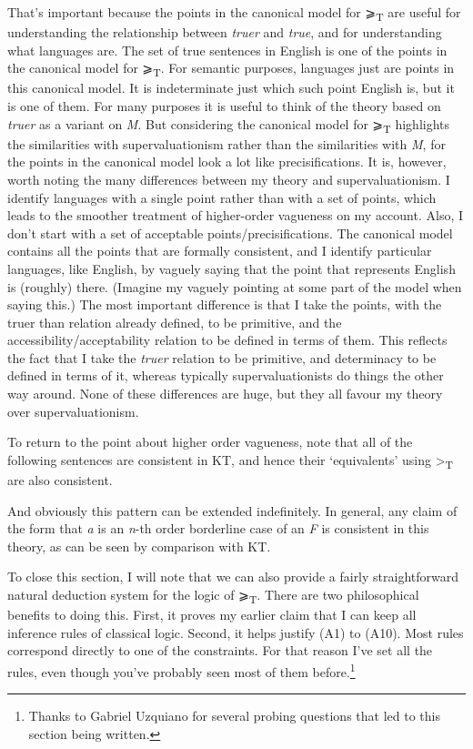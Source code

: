 \documentclass[
  10pt,
  letterpaper,
  DIV=11,
  numbers=noendperiod,
  twoside]{scrartcl}
\begin{document}
That's important because the points in the canonical model for
⩾\textsubscript{T} are useful for understanding the relationship between
\emph{truer} and \emph{true}, and for understanding what languages are.
The set of true sentences in English is one of the points in the
canonical model for ⩾\textsubscript{T}. For semantic purposes, languages
just are points in this canonical model. It is indeterminate just which
such point English is, but it is one of them. For many purposes it is
useful to think of the theory based on \emph{truer} as a variant on
\emph{M}. But considering the canonical model for ⩾\textsubscript{T}
highlights the similarities with supervaluationism rather than the
similarities with \emph{M}, for the points in the canonical model look a
lot like precisifications. It is, however, worth noting the many
differences between my theory and supervaluationism. I identify
languages with a single point rather than with a set of points, which
leads to the smoother treatment of higher-order vagueness on my account.
Also, I don't start with a set of acceptable points/precisifications.
The canonical model contains all the points that are formally
consistent, and I identify particular languages, like English, by
vaguely saying that the point that represents English is (roughly)
there. (Imagine my vaguely pointing at some part of the model when
saying this.) The most important difference is that I take the points,
with the truer than relation already defined, to be primitive, and the
accessibility/acceptability relation to be defined in terms of them.
This reflects the fact that I take the \emph{truer} relation to be
primitive, and determinacy to be defined in terms of it, whereas
typically supervaluationists do things the other way around. None of
these differences are huge, but they all favour my theory over
supervaluationism.

To return to the point about higher order vagueness, note that all of
the following sentences are consistent in KT, and hence their
`equivalents' using \textgreater{}\textsubscript{T} are also consistent.

And obviously this pattern can be extended indefinitely. In general, any
claim of the form that \emph{a} is an \emph{n}-th order borderline case
of an \emph{F} is consistent in this theory, as can be seen by
comparison with KT.

To close this section, I will note that we can also provide a fairly
straightforward natural deduction system for the logic of
⩾\textsubscript{T}. There are two philosophical benefits to doing this.
First, it proves my earlier claim that I can keep all inference rules of
classical logic. Second, it helps justify (A1) to (A10). Most rules
correspond directly to one of the constraints. For that reason I've set
all the rules, even though you've probably seen most of them
before.\footnote{Thanks to Gabriel Uzquiano for several probing
  questions that led to this section being written.}
\end{document}
